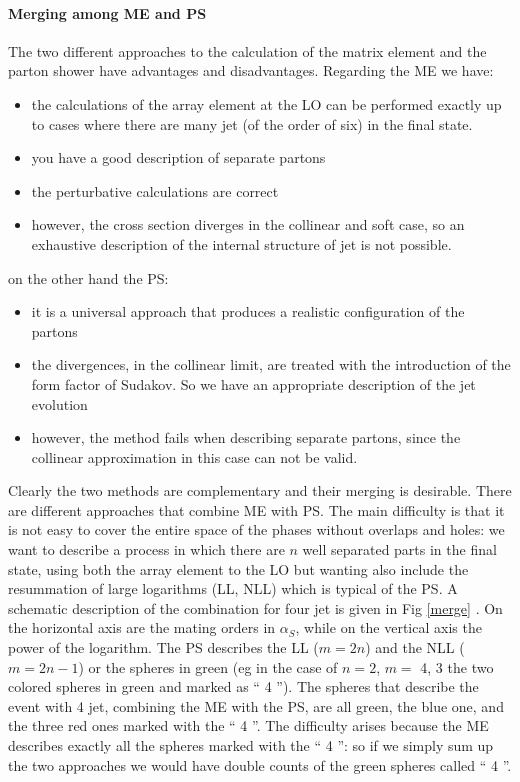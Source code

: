 \paragraph{Merging among ME and PS}
The two different approaches to the calculation of the matrix element and the parton shower have advantages and disadvantages. Regarding the ME we have:
\begin{itemize}
\item the calculations of the array element at the LO can be performed exactly up to cases where there are many jet (of the order of six) in the final state.
\item you have a good description of separate partons
\item the perturbative calculations are correct
\item however, the cross section diverges in the collinear and soft case, so an exhaustive description of the internal structure of jet is not possible.
\end{itemize}
on the other hand the PS:
\begin{itemize}
\item it is a universal approach that produces a realistic configuration of the partons
\item the divergences, in the collinear limit, are treated with the introduction of the form factor of Sudakov. So we have an appropriate description of the jet evolution
\item however, the method fails when describing separate partons, since the collinear approximation in this case can not be valid.
\end{itemize}
Clearly the two methods are complementary and their  merging is desirable. There are different approaches that combine ME with PS. The main difficulty is that it is not easy to cover the entire space of the phases without overlaps and holes: we want to describe a process in which there are $ n $ well separated parts in the final state, using both the array element to the LO but wanting also include the resummation of large logarithms (LL, NLL) which is typical of the PS. A schematic description of the combination for four jet is given in Fig \ref{merge} \cite{bib: lenzi}.
On the horizontal axis are the mating orders in $ \alpha_S $, while on the vertical axis the power of the logarithm.
The PS describes the LL ($ m = 2n $) and the NLL ($ m = 2n-1 $) or the spheres in green (eg in the case of $ n = 2 $, $ m = $ 4, 3 the two colored spheres in green and marked as `` 4 '').
The spheres that describe the event with 4 jet, combining the ME with the PS, are all green, the blue one, and the three red ones marked with the `` 4 ''.
The difficulty arises because the ME describes exactly all the spheres marked with the `` 4 '': so if we simply sum up the two approaches we would have double counts of the green spheres called `` 4 ''.

